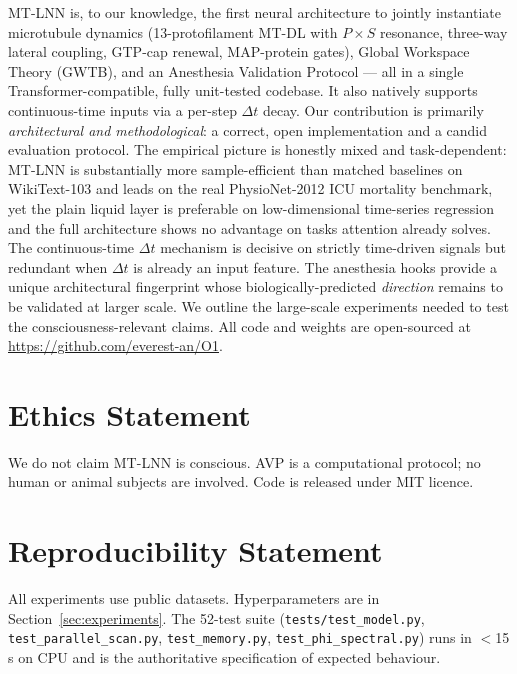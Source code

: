 \documentclass[11pt]{article}
\theoremstyle{definition}
\begin{document}
MT-LNN is, to our knowledge, the first neural architecture to jointly instantiate microtubule dynamics (13-protofilament MT-DL with $P\!\times\!S$ resonance, three-way lateral coupling, GTP-cap renewal, MAP-protein gates), Global Workspace Theory (GWTB), and an Anesthesia Validation Protocol — all in a single Transformer-compatible, fully unit-tested codebase. It also natively supports continuous-time inputs via a per-step $\Delta t$ decay. Our contribution is primarily \emph{architectural and methodological}: a correct, open implementation and a candid evaluation protocol. The empirical picture is honestly mixed and task-dependent: MT-LNN is substantially more sample-efficient than matched baselines on WikiText-103 and leads on the real PhysioNet-2012 ICU mortality benchmark, yet the plain liquid layer is preferable on low-dimensional time-series regression and the full architecture shows no advantage on tasks attention already solves. The continuous-time $\Delta t$ mechanism is decisive on strictly time-driven signals but redundant when $\Delta t$ is already an input feature. The anesthesia hooks provide a unique architectural fingerprint whose biologically-predicted \emph{direction} remains to be validated at larger scale. We outline the large-scale experiments needed to test the consciousness-relevant claims. All code and weights are open-sourced at \url{https://github.com/everest-an/O1}.

\section*{Ethics Statement}
We do not claim MT-LNN is conscious. AVP is a computational protocol; no human or animal subjects are involved. Code is released under MIT licence.

\section*{Reproducibility Statement}
All experiments use public datasets. Hyperparameters are in Section~\ref{sec:experiments}. The 52-test suite (\texttt{tests/test\_model.py}, \texttt{test\_parallel\_scan.py}, \texttt{test\_memory.py}, \texttt{test\_phi\_spectral.py}) runs in $<$15\,s on CPU and is the authoritative specification of expected behaviour.
\end{document}
